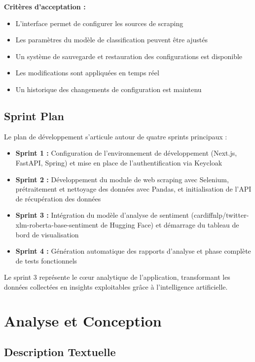 \textbf{Critères d'acceptation :}
\begin{itemize}
    \item L'interface permet de configurer les sources de scraping
    \item Les paramètres du modèle de classification peuvent être ajustés
    \item Un système de sauvegarde et restauration des configurations est disponible
    \item Les modifications sont appliquées en temps réel
    \item Un historique des changements de configuration est maintenu
\end{itemize}

\subsection{Sprint Plan}

Le plan de développement s'articule autour de quatre sprints principaux :

\begin{itemize}
    \item \textbf{Sprint 1 :} Configuration de l'environnement de développement (Next.js, FastAPI, Spring) et mise en place de l'authentification via Keycloak
    \item \textbf{Sprint 2 :} Développement du module de web scraping avec Selenium, prétraitement et nettoyage des données avec Pandas, et initialisation de l'API de récupération des données
    \item \textbf{Sprint 3 :} Intégration du modèle d'analyse de sentiment (cardiffnlp/twitter-xlm-roberta-base-sentiment de Hugging Face) et démarrage du tableau de bord de visualisation
    \item \textbf{Sprint 4 :} Génération automatique des rapports d'analyse et phase complète de tests fonctionnels
\end{itemize}

Le sprint 3 représente le cœur analytique de l'application, transformant les données collectées en insights exploitables grâce à l'intelligence artificielle.

\section{Analyse et Conception}

\subsection{Description Textuelle}

